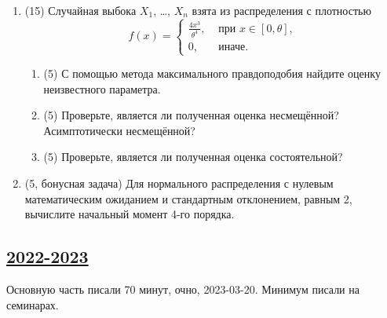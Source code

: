 \begin{enumerate}
\item (15) Случайная выбока $X_1$, \ldots, $X_n$ взята из распределения с плотностью
\[
  f(x) =
\begin{cases}
\frac{4x^3}{\theta^4}, &  \text{ при } x \in [0, \theta ],\\
0, & \text{ иначе}.
\end{cases}
\]
\begin{enumerate}
\item (5) С помощью метода максимального правдоподобия найдите оценку неизвестного параметра.
\item	(5) Проверьте, является ли полученная оценка несмещённой? Асимптотически несмещённой?
\item (5) Проверьте, является ли полученная оценка состоятельной? 
\end{enumerate}

\item (5, бонусная задача) Для нормального распределения с нулевым математическим ожиданием и стандартным отклонением, равным 2, 
вычислите начальный момент 4-го порядка.

\end{enumerate}


\subsection[2022-2023]{\hyperref[sec:sol_kr_03_ip_2022_2023]{2022-2023}}
\label{sec:kr_03_ip_2022_2023}

Основную часть писали 70 минут, очно, 2023-03-20. Минимум писали на семинарах. 

